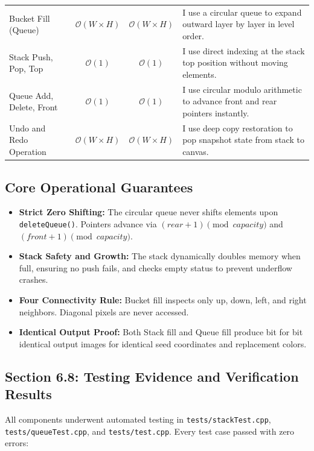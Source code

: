\documentclass[10pt,a4paper]{article}
\begin{document}
\begin{table}[h!]
\begin{tabularx}{\textwidth}{l c c X}
\addlinespace[1pt]
Bucket Fill (Queue) & $\mathcal{O}(W \times H)$ & $\mathcal{O}(W \times H)$ & I use a circular queue to expand outward layer by layer in level order. \\
\addlinespace[1pt]
Stack Push, Pop, Top & $\mathcal{O}(1)$ & $\mathcal{O}(1)$ & I use direct indexing at the stack top position without moving elements. \\
\addlinespace[1pt]
Queue Add, Delete, Front & $\mathcal{O}(1)$ & $\mathcal{O}(1)$ & I use circular modulo arithmetic to advance front and rear pointers instantly. \\
\addlinespace[1pt]
Undo and Redo Operation & $\mathcal{O}(W \times H)$ & $\mathcal{O}(W \times H)$ & I use deep copy restoration to pop snapshot state from stack to canvas. \\
\bottomrule
\end{tabularx}
\end{table}

\vspace{0.1cm}
\subsection*{Core Operational Guarantees}
\begin{itemize}[noitemsep,topsep=2pt,parsep=1pt]
    \item \textbf{Strict Zero Shifting:} The circular queue never shifts elements upon \texttt{deleteQueue()}. Pointers advance via $(rear + 1) \pmod{capacity}$ and $(front + 1) \pmod{capacity}$.
    \item \textbf{Stack Safety and Growth:} The stack dynamically doubles memory when full, ensuring no push fails, and checks empty status to prevent underflow crashes.
    \item \textbf{Four Connectivity Rule:} Bucket fill inspects only up, down, left, and right neighbors. Diagonal pixels are never accessed.
    \item \textbf{Identical Output Proof:} Both Stack fill and Queue fill produce bit for bit identical output images for identical seed coordinates and replacement colors.
\end{itemize}

\clearpage


\subsection*{Section 6.8: Testing Evidence and Verification Results}
All components underwent automated testing in \texttt{tests/stackTest.cpp}, \texttt{tests/queueTest.cpp}, and \texttt{tests/test.cpp}. Every test case passed with zero errors:
\end{document}
